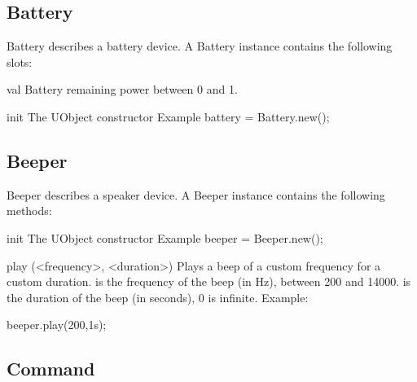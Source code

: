 \subsection{Battery}

Battery describes a battery device. A Battery instance contains the
following slots:
\begin{urbiscriptapi}
\item[val] Battery remaining power between 0 and 1.
\item[init] The UObject constructor Example battery = Battery.new();
\end{urbiscriptapi}

\subsection{Beeper}

Beeper describes a speaker device. A Beeper instance contains the following
methods:

\begin{urbiscriptapi}
\item[init] The UObject constructor Example beeper = Beeper.new();
\item[play](<frequency>, <duration>) Plays a beep of a custom frequency for
  a custom duration.   is the frequency of the beep (in Hz),
  between 200 and 14000.   is the duration of the beep (in
  seconds), 0 is infinite.  Example:
\begin{urbiunchecked}
beeper.play(200,1s);
\end{urbiunchecked}
\end{urbiscriptapi}

\subsection{Command}

